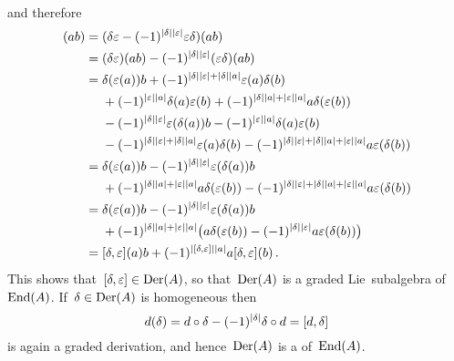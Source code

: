 \documentclass[a4paper,10pt,headings=standardclasses]{scrartcl}
\begin{document}
\begin{enumerate}
\begin{align*}
    \end{align*}
    and therefore
    \begingroup
    \allowdisplaybreaks
    \begin{align*}
      [\delta, \varepsilon](ab)
      ={}&
      (\delta \varepsilon - (-1)^{\hdeg{\delta} \hdeg{\varepsilon}} \varepsilon \delta)(ab)
      \\
      ={}&
        (\delta \varepsilon)(ab)
      - (-1)^{\hdeg{\delta} \hdeg{\varepsilon}}
        (\varepsilon \delta)(ab)
      \\
      ={}&
        \delta(\varepsilon(a)) b
      + (-1)^{\hdeg{\delta} \hdeg{\varepsilon} + \hdeg{\delta} \hdeg{a}}
        \varepsilon(a) \delta(b)
      \\
      {}&
      + (-1)^{\hdeg{\varepsilon} \hdeg{a}}
        \delta(a) \varepsilon(b)
      + (-1)^{\hdeg{\delta} \hdeg{a} + \hdeg{\varepsilon} \hdeg{a}}
        a \delta(\varepsilon(b))
      \\
      {}&
      - (-1)^{\hdeg{\delta} \hdeg{\varepsilon}}
        \varepsilon(\delta(a)) b
      - (-1)^{\hdeg{\varepsilon} \hdeg{a}}
        \delta(a) \varepsilon(b)
      \\
      {}&
      - (-1)^{\hdeg{\delta} \hdeg{\varepsilon} + \hdeg{\delta} \hdeg{a}}
        \varepsilon(a) \delta(b)
      - (-1)^{\hdeg{\delta} \hdeg{\varepsilon}  + \hdeg{\delta} \hdeg{a} + \hdeg{\varepsilon} \hdeg{a}}
        a \varepsilon(\delta(b))
      \\
      ={}&
        \delta(\varepsilon(a)) b
      - (-1)^{\hdeg{\delta} \hdeg{\varepsilon}}
        \varepsilon(\delta(a)) b
      \\
      {}&
      + (-1)^{\hdeg{\delta} \hdeg{a} + \hdeg{\varepsilon} \hdeg{a}}
        a \delta(\varepsilon(b))
      - (-1)^{\hdeg{\delta} \hdeg{\varepsilon}  + \hdeg{\delta} \hdeg{a} + \hdeg{\varepsilon} \hdeg{a}}
        a \varepsilon(\delta(b))
      \\
      ={}&
        \delta(\varepsilon(a)) b
      - (-1)^{\hdeg{\delta} \hdeg{\varepsilon}}
        \varepsilon(\delta(a)) b
      \\
      {}&
      + (-1)^{\hdeg{\delta} \hdeg{a} + \hdeg{\varepsilon} \hdeg{a}}
        \bigl(
            a \delta(\varepsilon(b))
          - (-1)^{\hdeg{\delta} \hdeg{\varepsilon}}
            a \varepsilon(\delta(b))
        \bigr)
      \\
      ={}&
        [\delta, \varepsilon](a) b
      + (-1)^{\hdeg{[\delta, \varepsilon]} \hdeg{a}}
        a [\delta, \varepsilon](b) \,.
    \end{align*}
    \endgroup
    This shows that~$[\delta, \varepsilon] \in \operatorname{Der}(A)$, so that~$\operatorname{Der}(A)$ is a graded Lie~subalgebra of~$\operatorname{End}(A)$.
    If~$\delta \in \operatorname{Der}(A)$ is homogeneous then
    \[
      d(\delta)
      =
      d \circ \delta
      - (-1)^{\lvert\delta\rvert}
      \delta \circ d
      =
      [d, \delta]
    \]
    is again a graded derivation, and hence~$\operatorname{Der}(A)$ is a {\dgsub} of~$\operatorname{End}(A)$.
    

\end{enumerate}
\end{document}
